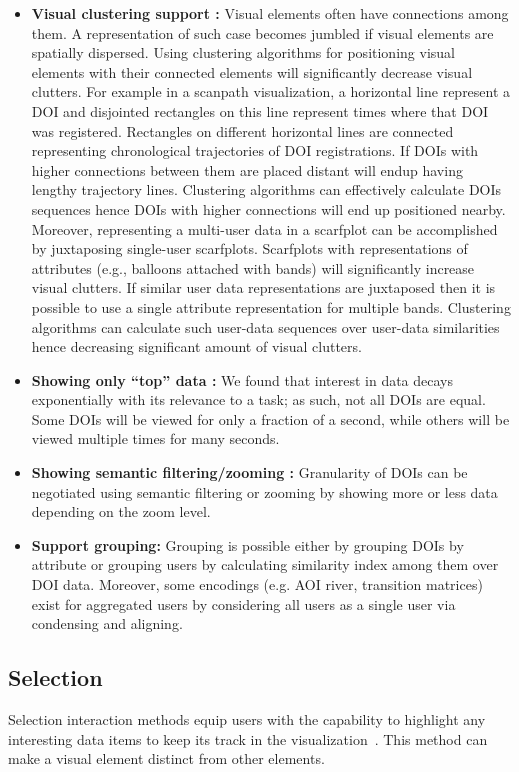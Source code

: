 \begin{itemize}
	\item \textbf{Visual clustering support :} Visual elements often have connections among them. A representation of such case becomes jumbled if visual elements are spatially dispersed. Using clustering algorithms for positioning visual elements with their connected elements will significantly decrease visual clutters. For example in a scanpath visualization, a horizontal line represent a DOI and disjointed rectangles on this line represent times where that DOI was registered. Rectangles on different horizontal lines are connected representing chronological trajectories of DOI registrations. If DOIs with higher connections between them are placed distant will endup having lengthy trajectory lines. Clustering algorithms can effectively calculate DOIs sequences hence DOIs with higher connections will end up positioned nearby. Moreover, representing a multi-user data in a scarfplot can be accomplished by juxtaposing single-user scarfplots. Scarfplots with representations of attributes (e.g., balloons attached with bands) will significantly increase visual clutters. If similar user data representations are juxtaposed then it is possible to use a single attribute representation for multiple bands. Clustering algorithms can calculate such user-data sequences over user-data similarities hence decreasing significant amount of visual clutters.  
	\item \textbf{Showing only ``top'' data :} We found that interest in data decays exponentially with its relevance to a task; as such, not all DOIs are equal. Some DOIs will be viewed for only a fraction of a second, while others will be viewed multiple times for many seconds. 
	\item \textbf{Showing semantic filtering/zooming :} Granularity of DOIs can be negotiated using semantic filtering or zooming by showing more or less data depending on the zoom level.
	\item \textbf{Support grouping:} Grouping is possible either by grouping DOIs by attribute or grouping users by calculating similarity index among them over DOI data. Moreover, some encodings (e.g. AOI river, transition matrices) exist for aggregated users by considering all users as a single user via condensing and aligning. 
\end{itemize}

\subsection{Selection}
Selection interaction methods equip users with the capability to highlight any interesting data items to keep its track in the visualization~\cite{yi2007toward}. This method can make a visual element distinct from other elements. 

